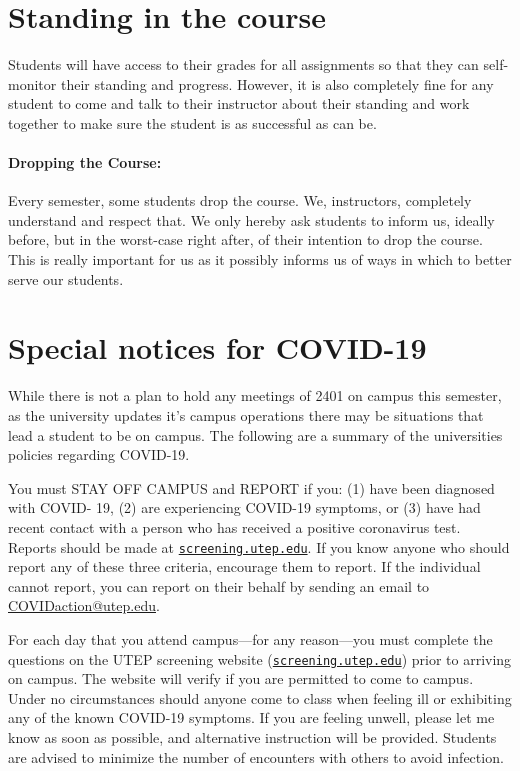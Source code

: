 \documentclass[12pt]{scrartcl}
\begin{document}
\section{Standing in the course}

Students will have access to their grades for all assignments so that they can self-monitor their standing and progress. 
However, it is also completely fine for any student to come and talk to their instructor about their standing and work together to make sure the student is as successful as can be.

\paragraph{Dropping the Course:} 
Every semester, some students drop the course. We, instructors, completely understand and respect that. We only hereby ask students to inform us, ideally before, but in the worst-case right after, of their intention to drop the course. This is really important for us as it possibly informs us of ways in which to better serve our students.


\section{Special notices for COVID-19}

While there is not a plan to hold any meetings of 2401 on campus this semester, 
as the university updates it's campus operations there may be situations that lead a student to be on campus. 
The following are a summary of the universities policies regarding COVID-19.

You must STAY OFF CAMPUS and REPORT if you:
(1) have been diagnosed with COVID- 19, 
(2) are experiencing COVID-19 symptoms, or 
(3) have had recent contact with a person who has received a positive coronavirus test. 
Reports should be made at \href{http://screening.utep.edu}{\texttt{screening.utep.edu}}. 
If you know anyone who should report any of these three criteria, encourage them to report. 
If the individual cannot report, you can report on their behalf by sending an email to \url{COVIDaction@utep.edu}.

For each day that you attend campus—for any reason—you must complete the questions on the UTEP screening website (\href{http://screening.utep.edu}{\texttt{screening.utep.edu}}) prior to arriving on campus. 
The website will verify if you are permitted to come to campus. 
Under no circumstances should anyone come to class when feeling ill or exhibiting any of the known COVID-19 symptoms. 
If you are feeling unwell, please let me know as soon as possible, 
and alternative instruction will be provided. Students are advised to minimize the number of encounters with others to avoid infection.
\end{document}

